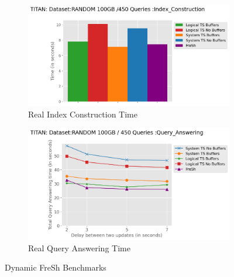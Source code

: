 \begin{figure}
	\centering
	\begin{subfigure}[c]{0.45\textwidth}
		\includegraphics[width=1\textwidth]   {figures/Experiments/Dynamic/Delays/index_construction_all.png}
		\caption{Real Index Construction Time}
		\label{fig:actual-index-Construction-time}
	\end{subfigure}
	\begin{subfigure}[c]{0.45\textwidth}
		\includegraphics[width=1\textwidth]   {figures/Experiments/Dynamic/Delays/qa_delay_x_axis.png}
		\caption{Real Query Answering Time}
		\label{fig:actual-query-answering-time}
	\end{subfigure}
	\caption{Dynamic FreSh Benchmarks}
	\label{fig:dfresh-fresh-random}
\end{figure}


